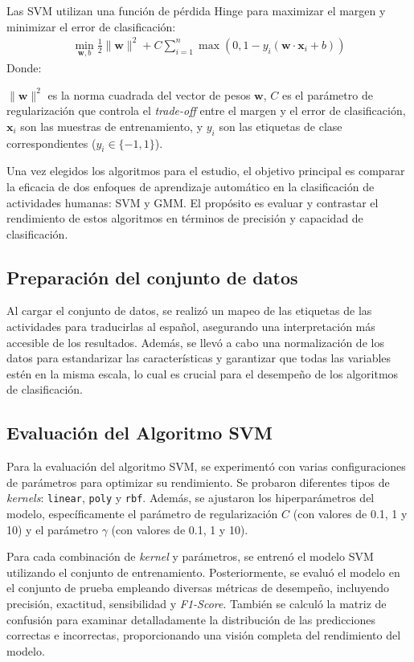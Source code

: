 \documentclass{esannV2}
\begin{document}
Las SVM utilizan una función de pérdida Hinge para maximizar el margen y minimizar el error de clasificación:
\begin{eqnarray}
\min_{\mathbf{w}, b} \frac{1}{2} \| \mathbf{w} \|^2 + C \sum_{i=1}^n \max(0, 1 - y_i (\mathbf{w} \cdot \mathbf{x}_i + b))
\end{eqnarray}
Donde:

 \( \| \mathbf{w} \|^2 \) es la norma cuadrada del vector de pesos \( \mathbf{w} \), \( C \) es el parámetro de regularización que controla el \textit{trade-off} entre el margen y el error de clasificación, \( \mathbf{x}_i \) son las muestras de entrenamiento, y \( y_i \) son las etiquetas de clase correspondientes (\( y_i \in \{-1, 1\} \)).

Una vez elegidos los algoritmos para el estudio, el objetivo principal es comparar la eficacia de dos enfoques de aprendizaje automático en la clasificación de actividades humanas: SVM y GMM. El propósito es evaluar y contrastar el rendimiento de estos algoritmos en términos de precisión y capacidad de clasificación.

\subsection{Preparación del conjunto de datos}

Al cargar el conjunto de datos, se realizó un mapeo de las etiquetas de las actividades para traducirlas al español, asegurando una interpretación más accesible de los resultados. Además, se llevó a cabo una normalización de los datos para estandarizar las características y garantizar que todas las variables estén en la misma escala, lo cual es crucial para el desempeño de los algoritmos de clasificación.

\subsection{Evaluación del Algoritmo SVM}

Para la evaluación del algoritmo SVM, se experimentó con varias configuraciones de parámetros para optimizar su rendimiento. Se probaron diferentes tipos de \textit{kernels}: \texttt{linear}, \texttt{poly} y \texttt{rbf}. Además, se ajustaron los hiperparámetros del modelo, específicamente el parámetro de regularización $C$ (con valores de 0.1, 1 y 10) y el parámetro $\gamma$ (con valores de 0.1, 1 y 10).

Para cada combinación de \textit{kernel} y parámetros, se entrenó el modelo SVM utilizando el conjunto de entrenamiento. Posteriormente, se evaluó el modelo en el conjunto de prueba empleando diversas métricas de desempeño, incluyendo precisión, exactitud, sensibilidad y \textit{F1-Score}. También se calculó la matriz de confusión para examinar detalladamente la distribución de las predicciones correctas e incorrectas, proporcionando una visión completa del rendimiento del modelo.
\end{document}
